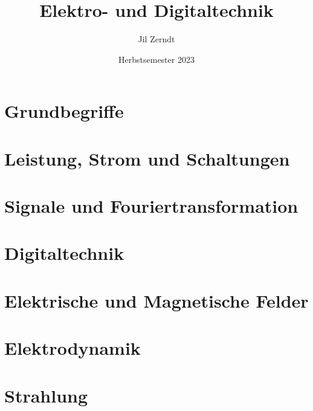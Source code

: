 \documentclass[a4paper, fontsize = 8pt]{scrartcl}
\title{Elektro- und Digitaltechnik}
\author{Jil Zerndt}
\date{Herbstsemester 2023}
\begin{document}
    \thispagestyle{TitlePageStyle}
		\maketitle
    \section{Grundbegriffe}
        
        
        
    
    \section{Leistung, Strom und Schaltungen}
        
        
    \section{Signale und Fouriertransformation}

    \section{Digitaltechnik}

    \section{Elektrische und Magnetische Felder}

    \section{Elektrodynamik}

    \section{Strahlung}

\end{document}
